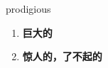 
\begin{frame}
{\huge prodigious}
\begin{center}
\begin{enumerate}\Large
  \item \textbf{巨大的}
  \item \textbf{惊人的，了不起的}
\end{enumerate}
\end{center}
\end{frame}

